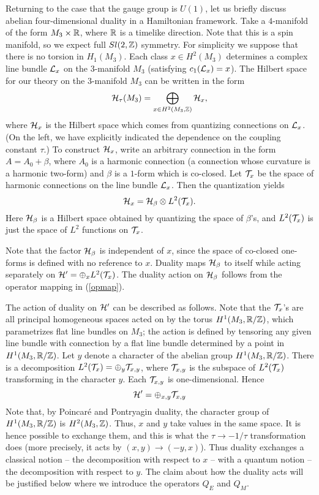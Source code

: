 Returning to the case that the gauge group is $U(1)$,
let us briefly discuss abelian four-dimensional duality in a Hamiltonian
framework.  Take a
$4$-manifold of the form $M_3\times {\Bbb R}$, where ${\Bbb R}$ is a
timelike direction. Note that this is a spin manifold, so we expect
full $Sl(2,{\Bbb Z})$ symmetry. For simplicity we suppose that there is no
torsion in $H_1(M_3)$. Each class
$x\in H^2(M_3)$ determines a complex line bundle ${\cal L}_x$ on the
$3$-manifold $M_3$ (satisfying $c_1({\cal L}_x)=x$).  The Hilbert space for our
theory on the $3$-manifold $M_3$ can be written in the form
\begin{equation}
{\cal H}_\tau(M_3)=\bigoplus_{x\in H^2(M_3,{\Bbb Z})} {\cal H}_x,
\end{equation}
where ${\cal H}_x$ is the Hilbert space which comes from quantizing connections
on ${\cal L}_x$.  (On the left,
we have explicitly indicated the dependence on the coupling
constant $\tau$.)  To construct ${\cal H}_x$,
write an arbitrary connection in the form $A=A_0+\beta$, where
$A_0$ is a harmonic connection (a connection whose curvature is a harmonic
two-form) and
$\beta$ is a $1$-form which is co-closed.
\def\T{{\cal T}}
Let $\T_x$ be the space of harmonic connections on the line bundle ${\cal
L}_x$.
Then the quantization
yields
\begin{equation}
\cH_x=\cH_\beta\otimes L^2(\T_x).
\end{equation}
Here ${\cal H}_\beta$ is a Hilbert space obtained by quantizing the space of
$\beta$'s, and $L^2(\T_x)$ is just the space of $L^2$ functions on $\T_x$.

Note that the factor ${\cal H}_\beta$ is independent of $x$, since the space
of co-closed one-forms is defined with no reference to $x$.  Duality
maps ${\cal H}_\beta$ to itself while  acting separately
on $\cH'=\oplus_x L^2(\T_x)$.   The duality action on ${\cal H}_\beta$
follows from the operator mapping in (\ref{opmap}).

The action of duality on ${\cal H}'$ can be described as follows.  Note that
the $\T_x$'s are all principal homogeneous spaces acted on by the torus
$H^1(M_3,{\Bbb R}/{\Bbb Z})$, which parametrizes flat line bundles on $M_3$; the
action is defined by tensoring any given line bundle with connection
by a flat line bundle determined by a point in $H^1(M_3,{\Bbb R}/{\Bbb Z})$.
Let $y$ denote a character of the abelian group $H^1(M_3,{\Bbb R}/{\Bbb Z})$.
There is a decomposition $L^2(\T_x)=\oplus_y\T_{x,y}$, where $\T_{x,y}$
is the subspace of $L^2(\T_x)$ transforming in the character $y$.  Each
$\T_{x,y}$ is one-dimensional.
Hence
\begin{equation}
\cH'=\oplus_{x,y}\T_{x,y}
\end{equation}
Note that, by Poincar\'e and Pontryagin duality, the character group
of $H^1(M_3,{\Bbb R}/{\Bbb Z})$ is $H^2(M_3,{\Bbb Z})$.  Thus, $x$ and $y$ take values
in the same space.  It is hence possible to exchange them, and this
is what the $\tau\to -1/\tau$ transformation does (more precisely,
it acts by $(x,y)\to (-y,x)$).
  Thus duality exchanges a classical
notion -- the decomposition with respect to $x$ -- with a quantum notion
-- the decomposition with respect to $y$.
The claim about how the duality acts will be justified below
where we introduce the operators $Q_E$ and $Q_M$.

